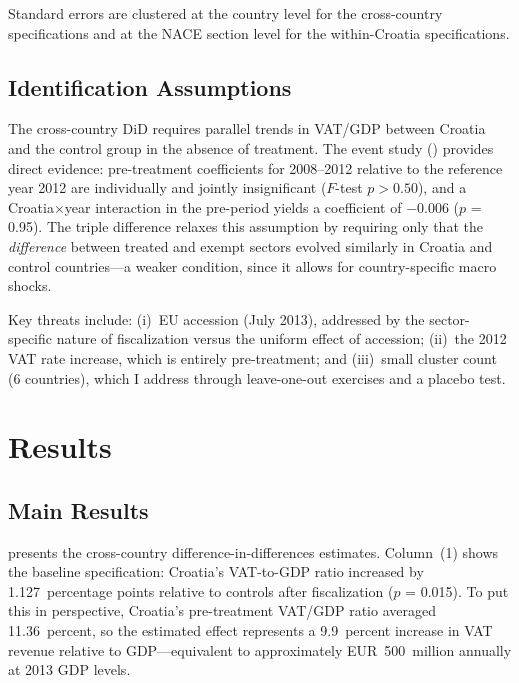 \documentclass[12pt]{article}
\begin{document}
Standard errors are clustered at the country level for the cross-country specifications and at the NACE section level for the within-Croatia specifications.

\subsection{Identification Assumptions}

The cross-country DiD requires parallel trends in VAT/GDP between Croatia and the control group in the absence of treatment. The event study () provides direct evidence: pre-treatment coefficients for 2008--2012 relative to the reference year 2012 are individually and jointly insignificant ($F$-test $p > 0.50$), and a Croatia$\times$year interaction in the pre-period yields a coefficient of $-$0.006 ($p$ = 0.95). The triple difference relaxes this assumption by requiring only that the \emph{difference} between treated and exempt sectors evolved similarly in Croatia and control countries---a weaker condition, since it allows for country-specific macro shocks.

Key threats include: (i)~EU accession (July 2013), addressed by the sector-specific nature of fiscalization versus the uniform effect of accession; (ii)~the 2012 VAT rate increase, which is entirely pre-treatment; and (iii)~small cluster count (6 countries), which I address through leave-one-out exercises and a placebo test.


\section{Results}
\label{sec:results}

\subsection{Main Results}



 presents the cross-country difference-in-differences estimates. Column~(1) shows the baseline specification: Croatia's VAT-to-GDP ratio increased by 1.127~percentage points relative to controls after fiscalization ($p$ = 0.015). To put this in perspective, Croatia's pre-treatment VAT/GDP ratio averaged 11.36~percent, so the estimated effect represents a 9.9~percent increase in VAT revenue relative to GDP---equivalent to approximately EUR~500~million annually at 2013 GDP levels.
\end{document}
